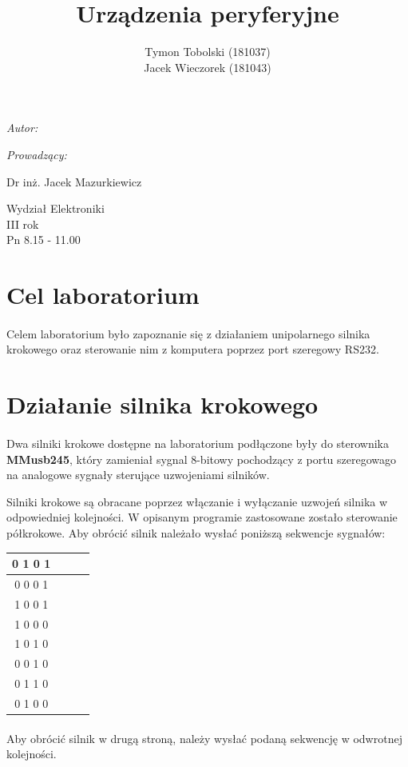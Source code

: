 \documentclass[wide,a4paper,titlepage,12pt] {article}
\title{Urządzenia peryferyjne}
\author{Tymon Tobolski (181037)\\ Jacek Wieczorek (181043)}
\makeatletter
\renewcommand{\maketitle}{
\begin{titlepage}
  \begin{center}
    \vspace*{3cm}
    \LARGE \@title \par
    \vspace{2cm}
    \textit{\small Autor:}\par
    \normalsize \@author\par \normalsize
    \vspace{3cm}
    \textit{\small Prowadzący:}\par
    Dr inż. Jacek Mazurkiewicz \par
    \vspace{2cm}
    Wydział Elektroniki\\ III rok\\ Pn 8.15 - 11.00\par
    \vspace{4cm}
    \small \@date
  \end{center}
\end{titlepage}
}
\makeatother
\begin{document}
\maketitle

\section{Cel laboratorium}
\paragraph{}
Celem laboratorium było zapoznanie się z działaniem unipolarnego silnika krokowego
oraz sterowanie nim z komputera poprzez port szeregowy RS232.

\section{Działanie silnika krokowego}
\paragraph{}
Dwa silniki krokowe dostępne na laboratorium podłączone były do sterownika \textbf{MMusb245},
który zamieniał sygnal 8-bitowy pochodzący z portu szeregowago na analogowe sygnały sterujące uzwojeniami silników.

Silniki krokowe są obracane poprzez włączanie i wyłączanie uzwojeń silnika w odpowiedniej kolejności.
W opisanym programie zastosowane zostało sterowanie półkrokowe. Aby obrócić silnik należało wysłać poniższą sekwencje sygnałów:


\begin{center}
    \begin{tabular}{|c|c|c|c|}
    \hline
    0 1 0 1 \\
    \hline
    0 0 0 1 \\
    \hline
    1 0 0 1 \\
    \hline
    1 0 0 0 \\
    \hline
    1 0 1 0 \\
    \hline
    0 0 1 0 \\
    \hline
    0 1 1 0 \\
    \hline
    0 1 0 0 \\
    \hline
   \end{tabular}
\end{center}


\paragraph{}
Aby obrócić silnik w drugą stroną, należy wysłać podaną sekwencję w odwrotnej kolejności.
\end{document}
